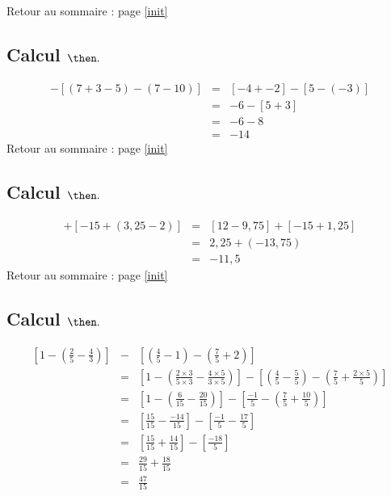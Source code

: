 \documentclass[14pt]{article}
\theoremstyle{remark}
\newcounter{n}
\renewcommand{\it}{Retour au sommaire : page \ref{init}
	\subsection{Calcul $ \mathbf{ \then}.$}\label{\then} \stepcounter{n} }
\theoremstyle{plain}
\begin{document}
\it \begin{eqnarray*}[(5-9)+(3-5)] - [(7+3-5) - (7-10)]
&=& [-4 + -2] - [ 5 - (-3) ]\\
&=& -6 - [ 5 + 3] \\
&=& -6 - 8 \\
&=& -14\end{eqnarray*}
\it \begin{eqnarray*} [12-(14-5+0,75)] + [-15 + (3,25-2)]& =& [12 - 9,75] + [-15+ 1,25] \\
&=& 2,25 + (-13,75)\\
&=& -11,5\end{eqnarray*}
\it \begin{eqnarray*}\left[1 - \left(\frac25-\frac43\right)\right] &- &
\left[ \left(\frac45-1\right) - \left(\frac75+2\right)\right]\\&=& \left[ 1 - \left(\frac{2\times3}{5\times3}-\frac{4\times5}{3\times5}\right)\right] - \left[ \left(\frac45-\frac55\right) - \left(\frac75+\frac{2\times5}5\right)\right]\\
&=& \left[1 - \left(\frac6{15}-\frac{20}{15}\right)\right] - \left[ \frac{-1}5 - \left(\frac75+\frac{10}5\right)\right]\\
&=& \left[\frac{15}{15} - \frac{-14}{15}\right] - \left[\frac{-1}5-\frac{17}5\right]\\
&=& \left[\frac{15}{15}+\frac{14}{15}\right] - \left[\frac{-18}5\right]\\
&=& \frac{29}{15} +\frac{18}{15}\\
&=&\frac{47}{15}
\end{eqnarray*}
\end{document}
